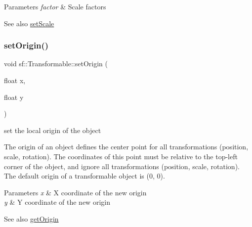 \begin{DoxyParams}{Parameters}
{\em factor} & Scale factors\\
\hline
\end{DoxyParams}
\begin{DoxySeeAlso}{See also}
\hyperlink{classsf_1_1_transformable_aaec50b46b3f41b054763304d1e727471}{set\+Scale} 
\end{DoxySeeAlso}
\mbox{\label{classsf_1_1_transformable_a56c67bd80aae8418d13fb96c034d25ec}} 
\subsubsection{\texorpdfstring{set\+Origin()}{setOrigin()}\hspace{0.1cm}{\footnotesize\ttfamily [1/2]}}
{\footnotesize\ttfamily void sf\+::\+Transformable\+::set\+Origin (\begin{DoxyParamCaption}\item[{float}]{x,  }\item[{float}]{y }\end{DoxyParamCaption})}



set the local origin of the object 

The origin of an object defines the center point for all transformations (position, scale, rotation). The coordinates of this point must be relative to the top-\/left corner of the object, and ignore all transformations (position, scale, rotation). The default origin of a transformable object is (0, 0).


\begin{DoxyParams}{Parameters}
{\em x} & X coordinate of the new origin \\
\hline
{\em y} & Y coordinate of the new origin\\
\hline
\end{DoxyParams}
\begin{DoxySeeAlso}{See also}
\hyperlink{classsf_1_1_transformable_a37ea3500afac234814a43ce809ef264e}{get\+Origin} 
\end{DoxySeeAlso}
\mbox{\label{classsf_1_1_transformable_aa93a835ffbf3bee2098dfbbc695a7f05}} 
